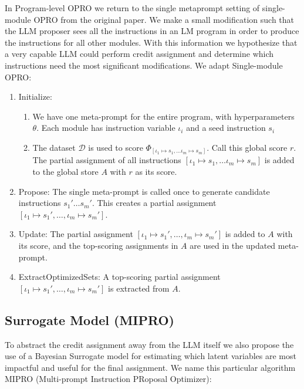 In Program-level OPRO we return to the single metaprompt setting of single-module OPRO from the original paper.  We make a small modification such that the LLM proposer sees all the instructions in an LM program in order to produce the instructions for all other modules.  With this information we hypothesize that a very capable LLM could perform credit assignment and determine which instructions need the most significant modifications.  We adapt Single-module OPRO:

\begin{enumerate}
    \item Initialize:
    \begin{enumerate}
        \item We have one meta-prompt for the entire program, with hyperparameters $\theta$.  Each module has instruction variable $\iota_{i}$ and a seed instruction $s_i$
        \item The dataset $\mathcal{D}$ is used to score $\Phi_{[\iota_{1}\mapsto s_{1}, \ldots \iota_{m}\mapsto s_{m}]}$. Call this global score $r$.  The partial assignment of all instructions $[\iota_{1}\mapsto s_{1}, \ldots \iota_{m}\mapsto s_{m}]$ is added to the global store $A$ with $r$ as its score.
    \end{enumerate}
    \item Propose: The single meta-prompt is called once to generate candidate instructions $s_{1}' \ldots s_{m}'$. This creates a partial assignment $[\iota_{1} \mapsto s_{1}', \ldots, \iota_{m} \mapsto s_{m}']$.
    \item Update: The partial assignment $[\iota_{1} \mapsto s_{1}', \ldots, \iota_{m} \mapsto s_{m}']$ is added to $A$ with its score, and the top-scoring assignments in $A$ are used in the updated meta-prompt.
    \item ExtractOptimizedSets: A top-scoring partial assignment $[\iota_{1} \mapsto s_{1}', \ldots, \iota_{m} \mapsto s_{m}']$ is extracted from $A$.
\end{enumerate}

\subsection{Surrogate Model (MIPRO)}
To abstract the credit assignment away from the LLM itself we also propose the use of a Bayesian Surrogate model for estimating which latent variables are most impactful and useful for the final assignment.  We name this particular algorithm MIPRO (Multi-prompt Instruction PRoposal Optimizer):

